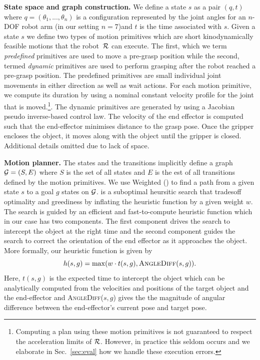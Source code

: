 \documentclass[conference]{IEEEtran}
\begin{document}
\textbf{State space and graph construction.}
We define a state $s$ as a pair $(q,t)$ where $q = (\theta_1, ..., \theta_n)$ is a configuration represented by the joint angles for an $n$-DOF robot arm (in our setting $n=7$)and $t$ is the time associated with $s$.
%
Given a state $s$ we define two types of motion primitives which are short kinodynamically feasible motions that the robot~$\mathcal{R}$ can execute. The first, which we term \emph{predefined} primitives are used to move a pre-grasp position while the second, termed \emph{dynamic} primitives are used to perform grasping after the robot reached a pre-grasp position.
%
The predefined primitives are small individual joint movements in either direction as well as wait actions.
For each motion primitive, we compute its duration by using a nominal constant velocity profile for the  joint that is moved.\footnote{Computing a plan using these motion primitives is not guaranteed to respect the acceleration limits of $\mathcal{R}$. However, in practice this seldom occurs and we elaborate in Sec.~\ref{sec:eval} how we handle these execution errors.}.
%
The dynamic primitives are generated by using a Jacobian pseudo inverse-based control law. 
The velocity of the end effector is computed such that the end-effector minimises distance to the grasp pose. Once the gripper encloses the object, it moves along with the object until the gripper is closed.
Additional details omitted due to lack of space.

\textbf{Motion planner.}
The states and the transitions implicitly define a graph $\mathcal{G} = (S,E)$ where $S$ is the set of all states and $E$ is the est of all transitions defined by the motion primitives. We use Weighted \astar (\wastar) to find a path from a given state $s$ to a goal $g$ states on $\mathcal{G}$. 
\wastar is a suboptimal heursitic search that tradesoff optimality and greediness by inflating the heuristic function by a given weight $w$. 
The search is guided by an efficient and fast-to-compute heuristic function which in our case has two components.
The first component drives the search to intercept the object at the right time and 
the second component guides the search to correct the orientation of the end effector as it approaches the object. 
More formally, our heuristic function is given by
$$
 h(s,g) = \max (w \cdot t(s,g), \textsc{AngleDiff}(s,g)).
$$
Here, $t(s,g)$ is the expected time to intercept the object which can be analytically computed from the velocities and positions of the target object and the end-effector and \textsc{AngleDiff}($s,g$) gives the the magnitude of angular difference between the end-effector's current pose and target pose.
\end{document}
